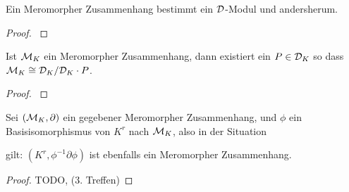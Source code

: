 \begin{thm}
  \cite[Thm 4.3.2]{sabbah_cimpa90}
  Ein Meromorpher Zusammenhang bestimmt ein $\mathcal{D}$-Modul
  und andersherum.
\end{thm}
\begin{proof}
  \cite[Thm 4.3.2]{sabbah_cimpa90}
\end{proof}

\begin{lem}
  \cite[Satz 4.12]{ZulaBarbara}
  \cite[Thm 4.3.2]{sabbah_cimpa90}
  Ist $\mathcal{M}_K$ ein Meromorpher Zusammenhang, dann existiert ein $P\in\mathcal{D}_K$ so dass
  $\mathcal{M}_K\cong\mathcal{D}_K/\mathcal{D}_K\cdot P$.
\end{lem}
\begin{proof}
  \cite[Satz 4.12]{ZulaBarbara}
\end{proof}

\begin{lem}
  Sei $(\mathcal{M}_K,\partial)$ ein gegebener Meromorpher Zusammenhang, und $\phi$ ein
  Basisisomorphismus von $K^r$ nach $\mathcal{M}_K$, also in der Situation
  \begin{center}
  \end{center}
  gilt: $(K^r,\phi^{-1}\partial\phi)$ ist ebenfalls ein Meromorpher Zusammenhang.
\end{lem}
\begin{proof}
  TODO, (3. Treffen)
\end{proof}

